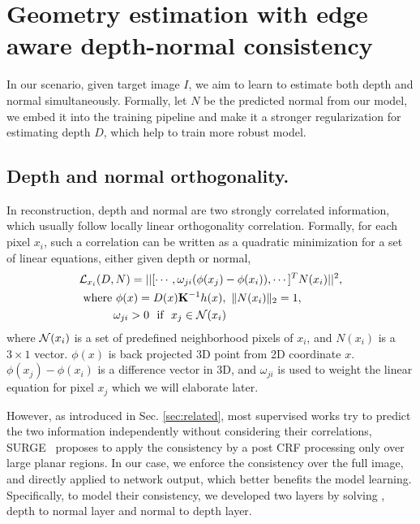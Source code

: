 \vspace{-0.7\baselineskip}
\section{Geometry estimation with edge aware depth-normal consistency}
\label{sec:approach}
\vspace{-0.3\baselineskip}

In our scenario, given target image $I$, we aim to learn to estimate both depth and normal simultaneously. Formally, let $N$ be the predicted normal from our model, we embed it into the training pipeline and make it a stronger regularization for estimating depth $D$, which help to train more robust model.

\vspace{-0.5\baselineskip}
\subsection{Depth and normal orthogonality.}
\label{sub:depth_and_normal_orthogonality}
\vspace{-0.3\baselineskip}

In reconstruction, depth and normal are two strongly correlated information, which usually follow locally linear orthogonality correlation. Formally, for each pixel $x_i$, such a correlation can be written as a quadratic minimization for a set of linear equations, either given depth or normal,
\begin{align}
\label{eq:orthognal}
&{\mathcal L}_{x_i}(D, N) = ||[\cdots,\omega_{ji}(\phi(x_j) - \phi(x_i)), \cdots]^T  N(x_i)||^2, \nonumber \\
&~\text{where~} \phi(x) = D(x){\mathbf K}^{-1}h(x), \text{~} \|N(x_i)\|_2 = 1, \nonumber\\
&~\text{~~~~~~~~} \omega_{ji} > 0 \text{~~if~~} x_j \in {\mathcal N}(x_i)
\end{align}
where ${\mathcal N}(x_i)$ is a set of predefined neighborhood pixels of $x_i$, and $N(x_i)$ is a $3 \times 1$ vector. $\phi(x)$ is back projected 3D point from 2D coordinate $x$. $\phi(x_j) - \phi(x_i)$ is a difference vector in 3D, and $\omega_{ji}$ is used to weight the linear equation for pixel $x_j$ which we will elaborate later.

However, as introduced in Sec. \ref{sec:related}, most supervised works try to predict the two information independently without considering their correlations, SURGE~\cite{peng2016depth} proposes to apply the consistency by a post CRF processing only over large planar regions. In our case, we enforce the consistency over the full image, and directly applied to network output, which better benefits the model learning. Specifically, to model their consistency, we developed two layers by solving , \ie depth to normal layer and normal to depth layer. 

